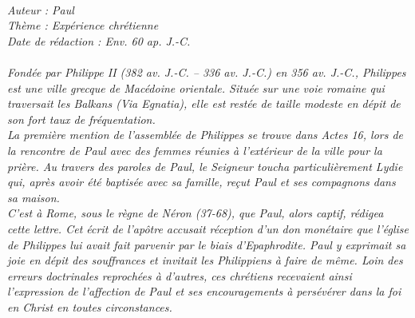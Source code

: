 \BFont
\noindent\hrulefill
{\footnotesize
\textit{
\bigskip
{\centering{}
\\Auteur : Paul
\\Thème : Expérience chrétienne
\\Date de rédaction : Env. 60 ap. J.-C.\\}
}
\textit{
\\Fondée par Philippe II (382 av. J.-C. – 336 av. J.-C.) en 356 av. J.-C., Philippes est une ville grecque de Macédoine orientale. Située sur une voie romaine qui traversait les Balkans (Via Egnatia), elle est restée de taille modeste en dépit de son fort taux de fréquentation.
\\La première mention de l'assemblée de Philippes se trouve dans Actes 16, lors de la rencontre de Paul avec des femmes réunies à l'extérieur de la ville pour la prière. Au travers des paroles de Paul, le Seigneur toucha particulièrement Lydie qui, après avoir été baptisée avec sa famille, reçut Paul et ses compagnons dans sa maison.
\\C'est à Rome, sous le règne de Néron (37-68), que Paul, alors captif, rédigea cette lettre. Cet écrit de l'apôtre accusait réception d'un don monétaire que l'église de Philippes lui avait fait parvenir par le biais d'Epaphrodite. Paul y exprimait sa joie en dépit des souffrances et invitait les Philippiens à faire de même. Loin des erreurs doctrinales reprochées à d'autres, ces chrétiens recevaient ainsi l'expression de l'affection de Paul et ses encouragements à persévérer dans la foi en Christ en toutes circonstances.\bigskip
}
}
\par\nobreak\noindent\hrulefill
